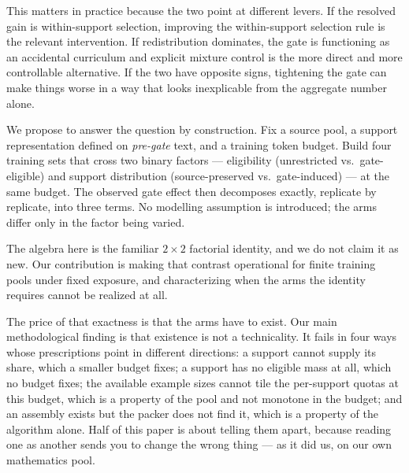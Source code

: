 \documentclass[10pt,twocolumn]{article}
\begin{document}
This matters in practice because the two point at different levers. If the resolved gain is
within-support selection, improving the within-support selection rule is the relevant
intervention. If redistribution dominates, the gate is functioning as an accidental curriculum
and explicit mixture control is the more direct and more controllable alternative. If the two
have opposite signs, tightening the gate can make things worse in a way that looks inexplicable
from the aggregate number alone.

We propose to answer the question by construction. Fix a source pool, a support representation
defined on \emph{pre-gate} text, and a training token budget. Build four training sets that
cross two binary factors --- eligibility (unrestricted vs.\ gate-eligible) and support
distribution (source-preserved vs.\ gate-induced) --- at the same budget. The observed gate
effect then decomposes exactly, replicate by replicate, into three terms. No modelling
assumption is introduced; the arms differ only in the factor being varied.

The algebra here is the familiar $2\times2$ factorial identity, and we do not claim it as new.
Our contribution is making that contrast operational for finite training pools under fixed
exposure, and characterizing when the arms the identity requires cannot be realized at all.

The price of that exactness is that the arms have to exist. Our main methodological finding is
that existence is not a technicality. It fails in four ways whose prescriptions point in
different directions: a support cannot supply its share, which a smaller budget fixes; a support
has no eligible mass at all, which no budget fixes; the available example sizes cannot tile the
per-support quotas at this budget, which is a property of the pool and not monotone in the
budget; and an assembly exists but the packer does not find it, which is a property of the
algorithm alone. Half of this paper is about telling them apart, because reading one as another
sends you to change the wrong thing --- as it did us, on our own mathematics pool.
\end{document}
